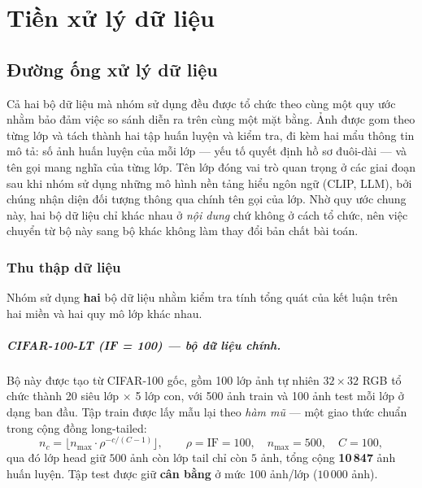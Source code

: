 \chapter{Tiền xử lý dữ liệu}
\label{chap:data}

\section{Đường ống xử lý dữ liệu}

Cả hai bộ dữ liệu mà nhóm sử dụng đều được tổ chức theo cùng một quy ước nhằm bảo đảm việc so sánh
diễn ra trên cùng một mặt bằng. Ảnh được gom theo từng lớp và tách thành hai tập huấn luyện và kiểm
tra, đi kèm hai mẩu thông tin mô tả: số ảnh huấn luyện của mỗi lớp --- yếu tố quyết định hồ sơ
đuôi-dài --- và tên gọi mang nghĩa của từng lớp. Tên lớp đóng vai trò quan trọng ở các giai đoạn sau
khi nhóm sử dụng những mô hình nền tảng hiểu ngôn ngữ (CLIP, LLM), bởi chúng nhận diện đối tượng
thông qua chính tên gọi của lớp. Nhờ quy ước chung này, hai bộ dữ liệu chỉ khác nhau ở \emph{nội
dung} chứ không ở cách tổ chức, nên việc chuyển từ bộ này sang bộ khác không làm thay đổi bản chất
bài toán.

\subsection{Thu thập dữ liệu}

Nhóm sử dụng \textbf{hai} bộ dữ liệu nhằm kiểm tra tính tổng quát của kết luận trên hai miền và hai
quy mô lớp khác nhau.

\paragraph{CIFAR-100-LT (IF = 100) --- bộ dữ liệu chính.} Bộ này được tạo từ CIFAR-100 gốc, gồm 100
lớp ảnh tự nhiên $32\times32$ RGB tổ chức thành 20 siêu lớp $\times$ 5 lớp con, với 500 ảnh train và
100 ảnh test mỗi lớp ở dạng ban đầu. Tập train được lấy mẫu lại theo \emph{hàm mũ} --- một giao thức
chuẩn trong cộng đồng long-tailed:
\begin{equation}
n_c = \big\lfloor n_{\max}\cdot \rho^{-c/(C-1)} \big\rfloor,
\qquad \rho = \text{IF} = 100,\quad n_{\max}=500,\quad C=100,
\label{eq:exp-decay}
\end{equation}
qua đó lớp head giữ $500$ ảnh còn lớp tail chỉ còn $5$ ảnh, tổng cộng \textbf{10\,847} ảnh huấn
luyện. Tập test được giữ \textbf{cân bằng} ở mức $100$ ảnh/lớp ($10\,000$ ảnh).

